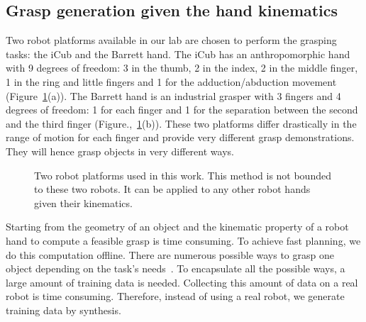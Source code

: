 \subsection{Grasp generation given the hand kinematics}
\label{cha3:sec2:demonstration}

Two robot platforms available in our lab are chosen to perform the grasping tasks: the iCub and the Barrett hand. The iCub has an anthropomorphic hand with 9 degrees of freedom: 3 in the thumb, 2 in the index, 2 in the middle finger, 1 in the ring and little fingers and 1 for the adduction/abduction movement (Figure~\ref{fig:robothand}(a)). The Barrett hand is an industrial grasper with 3 fingers and 4 degrees of freedom: 1 for each finger and 1 for the separation between the second and the third finger (Figure.,~\ref{fig:robothand}(b)). These two platforms differ drastically in the range of motion for each finger and provide very different grasp demonstrations. They will hence grasp objects in very different ways.

\begin{figure}
  \centering
  \caption{Two robot platforms used in this work. This method is not bounded to these two robots. It can be applied to any other robot hands given their kinematics.}
  \label{fig:robothand}
\end{figure}

Starting from the geometry of an object and the kinematic property of a robot hand to compute a feasible grasp is time consuming. To achieve fast planning, we do this computation offline. There are numerous possible ways to grasp one object depending on the task's needs~\citep{sahar2012,el2013generation}. To encapsulate all the possible ways, a large amount of training data is needed. Collecting this amount of data on a real robot is time consuming. Therefore, instead of using a real robot, we generate training data by synthesis.


